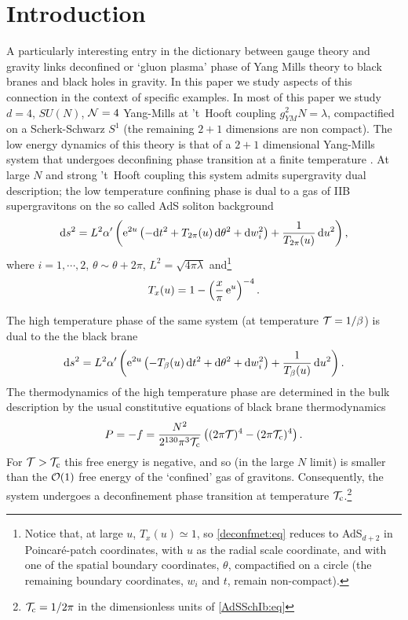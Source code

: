 
\section{Introduction}\label{sec:intro}

A particularly interesting entry in the dictionary between gauge
theory and gravity links deconfined or `gluon plasma' phase of Yang
Mills theory to black branes and black holes in gravity. In this
paper we study aspects of this connection in the context of specific
examples. In most of this paper we study  $d=4$, $SU(N)$, $\mathcal{N}=4$
Yang-Mills at 't~Hooft coupling $g^2_{YM}N=\lambda$, compactified on
a Scherk-Schwarz $S^1$ (the remaining $2+1$ dimensions are non
compact). The low energy dynamics of this theory is that of a $2+1$
dimensional Yang-Mills system that undergoes deconfining phase
transition at a finite temperature \cite{Witten:1998zw}. At large
$N$ and strong 't~Hooft coupling this system admits supergravity
dual description; the low temperature confining phase is dual to a
gas of IIB supergravitons on the so called AdS soliton background
\cite{Witten:1998zw}
%
\begin{equation}\label{deconfmet:eq}
  \mathrm{d} s^2 = L^2 {\alpha^{\prime}} \left( \mathrm{e}^{2u}
       \left( -\mathrm{d} t^2 + T_{2 \pi}(u)\, \mathrm{d}\theta^2 + \mathrm{d} w_i^2 \right)
       + \frac{1}{T_{2 \pi}(u)}\, \mathrm{d} u^2 \right),
\end{equation}
%
where $i= 1,\cdots, 2$, $\theta\sim\theta+2\pi$, $L^2=
\sqrt{4\pi\lambda}$ and\footnote{Notice that, at large $u$,
$T_x(u)\simeq 1$, so \eqref{deconfmet:eq} reduces to AdS$_{d+2}$ in
Poincar\'e-patch coordinates, with $u$ as the radial scale
coordinate, and with one of the spatial boundary coordinates,
$\theta$, compactified on a circle (the remaining boundary
coordinates, $w_i$ and $t$, remain non-compact).}
%
\begin{equation}\label{AdSSchII:eq}
 T_{x}(u) = 1 - \left( \frac{x}{\pi} \,\mathrm{e}^u \right)^{-4}.
\end{equation}
%


The high temperature phase of the same system (at temperature
$\mathcal{T}=1/\beta$) is dual to the the black brane
%
\begin{equation} \label{AdSSchIb:eq}
  \mathrm{d} s^2 = L^2 {\alpha^{\prime}} \left( \mathrm{e}^{2 u}
     \left( -T_{\beta}(u)\, \mathrm{d} t^2 + \mathrm{d}\theta^2 + \mathrm{d} w_i^2 \right)
     + \frac{1}{T_{\beta}(u)}\, \mathrm{d} u^2 \right) .
\end{equation}
%
The thermodynamics of the high temperature phase are determined in
the bulk description by the usual constitutive equations of black
brane thermodynamics \cite{Aharony:2005bm}
%
\begin{equation}\label{equationofstate:eq}
P=-f=\frac{N^2} {2^{130} \pi^3 \mathcal{T_\mathrm{c}}}\left( (2 \pi \mathcal{T})^4-(2 \pi
\mathcal{T_\mathrm{c}})^4 \right).
\end{equation}
%
For $\mathcal{T}>\mathcal{T_\mathrm{c}}$ this free energy is negative, and so (in the large
$N$ limit) is smaller than the $\mathcal{O}(1)$ free energy of the
`confined' gas of gravitons. Consequently, the system undergoes a
deconfinement phase transition at temperature $\mathcal{T_\mathrm{c}}$.\footnote{$\mathcal{T_\mathrm{c}} =
1/2 \pi$ in the dimensionless units of \eqref{AdSSchIb:eq}}

